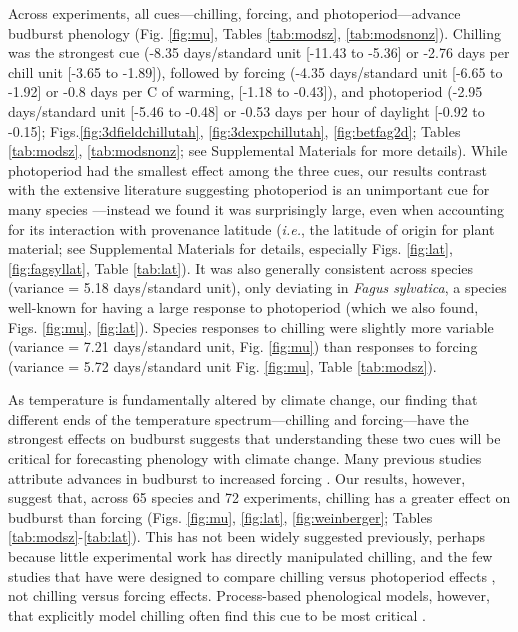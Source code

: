\documentclass{article}
\begin{document}
\par Across experiments, all cues---chilling, forcing, and photoperiod---advance budburst phenology (Fig. \ref{fig:mu}, Tables \ref{tab:modsz}, \ref{tab:modsnonz}). Chilling was the strongest cue (-8.35 days/standard unit [-11.43 to -5.36] or -2.76 days per chill unit [-3.65 to -1.89]), followed by forcing (-4.35 days/standard unit [-6.65 to -1.92] or -0.8 days per \degree C of warming, [-1.18 to -0.43]), and photoperiod (-2.95 days/standard unit [-5.46 to -0.48] or -0.53 days per hour of daylight [-0.92 to -0.15]; Figs.\ref{fig:3dfieldchillutah}, \ref{fig:3dexpchillutah}, \ref{fig:betfag2d}; Tables \ref{tab:modsz}, \ref{tab:modsnonz}; see Supplemental Materials for more details). While photoperiod had the smallest effect among the three cues, our results contrast with the extensive literature suggesting photoperiod is an unimportant cue for many species \emph{\citep{zohner2016,fu2019}}---instead we found it was surprisingly large, even when accounting for its interaction with provenance latitude (\emph{i.e.}, the latitude of origin for plant material; see Supplemental Materials for details, especially Figs. \ref{fig:lat}, \ref{fig:fagsyllat}, Table \ref{tab:lat}). It was also generally consistent across species (variance = 5.18 days/standard unit), only deviating in \emph{Fagus sylvatica}, a species well-known for having a large response to photoperiod (which we also found, Figs. \ref{fig:mu}, \ref{fig:lat}). Species responses to chilling were slightly more variable (variance = 7.21 days/standard unit, Fig. \ref{fig:mu}) than responses to forcing (variance = 5.72 days/standard unit Fig. \ref{fig:mu}, Table \ref{tab:modsz}). 

\par As temperature is fundamentally altered by climate change, our finding that different ends of the temperature spectrum---chilling and forcing---have the strongest effects on budburst suggests that understanding these two cues will be critical for forecasting phenology with climate change. Many previous studies attribute advances in budburst to increased forcing \emph{\citep{menzel2006,harrington2015,Basler:2014aa,bradley1999}}. Our results, however, suggest that, across 65 species and 72 experiments, chilling has a greater effect on budburst than forcing (Figs. \ref{fig:mu}, \ref{fig:lat}, \ref{fig:weinberger}; Tables \ref{tab:modsz}-\ref{tab:lat}). This has not been widely suggested previously, perhaps because little experimental work has directly manipulated chilling, and the few studies that have were designed to compare chilling versus photoperiod effects \emph{\citep[e.g.,][]{zohner2016,Basler:2014aa,Caffarra:2011qf,Laube:2014a}}, not chilling versus forcing effects. Process-based phenological models, however, that explicitly model chilling often find this cue to be most critical \emph{\citep[e.g.,][]{gauzere2019,Laube:2014a,Heide:2005aa}}.
\end{document}

